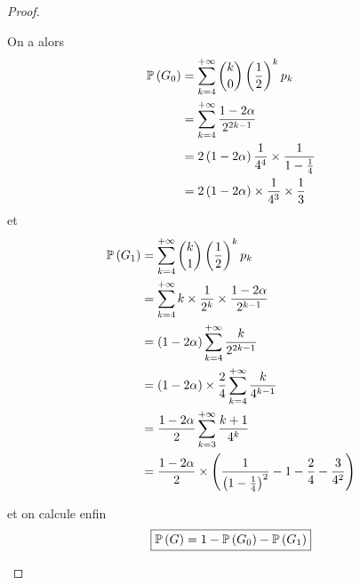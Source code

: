 \documentclass[12pt]{article}
\begin{document}
\begin{proof}
\begin{enumerate}
        On a alors 
        \begin{align}
            \P\left(G_{0}\right)
            &=\sum_{k=4}^{+\infty}\binom{k}{0}\left(\frac{1}{2}\right)^{k}p_{k}\\
            &=\sum_{k=4}^{+\infty}\frac{1-2\alpha}{2^{2k-1}}\\
            &=2\left(1-2\alpha\right)\frac{1}{4^{4}}\times\frac{1}{1-\frac{1}{4}}\\
            &=2\left(1-2\alpha\right)\times\frac{1}{4^{3}}\times\frac{1}{3}
        \end{align}
        et 
        \begin{align}
            \P\left(G_{1}\right)
            &=\sum_{k=4}^{+\infty}\binom{k}{1}\left(\frac{1}{2}\right)^{k}p_{k}\\
            &=\sum_{k=4}^{+\infty}k\times\frac{1}{2^{k}}\times\frac{1-2\alpha}{2^{k-1}}\\
            &=\left(1-2\alpha\right)\sum_{k=4}^{+\infty}\frac{k}{2^{2k-1}}\\
            &=\left(1-2\alpha\right)\times\frac{2}{4}\sum_{k=4}^{+\infty}\frac{k}{4^{k-1}}\\
            &=\frac{1-2\alpha}{2}\sum_{k=3}^{+\infty}\frac{k+1}{4^{k}}\\
            &=\frac{1-2\alpha}{2}\times\left(\frac{1}{\left(1-\frac{1}{4}\right)^{2}}-1-\frac{2}{4}-\frac{3}{4^{2}}\right)
        \end{align}

        et on calcule enfin 
        \begin{equation}
            \boxed{\P\left(G\right)=1-\P\left(G_{0}\right)-\P\left(G_{1}\right)}
        \end{equation}
    \end{enumerate}
\end{proof}
\end{document}
